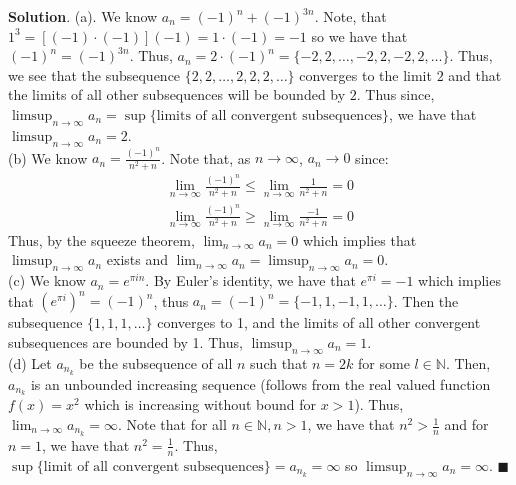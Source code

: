 \documentclass[12pt]{article}
\renewcommand{\=}[1]{\stackrel{#1}{=}} %
\providecommand{\NN}{\mathbb{N}}
\theoremstyle{definition}
\newenvironment{s}{%
        \begin{trivlist} \item \textbf{Solution}. }{%
            \hspace*{\fill} $\blacksquare$\end{trivlist}}%
\begin{document}
\begin{s}
    (a). We know $a_n = (-1)^n + (-1)^{3n}$. Note, that $1^3 = [(-1)\cdot(-1)](-1) = 1\cdot(-1) = -1$ so
    we have that $(-1)^n = (-1)^{3n}$. Thus, $a_n = 2\cdot(-1)^n = \{-2,2,\hdots,-2,2,-2,2,\hdots\}$. Thus, we see
    that the subsequence $\{2,2,\hdots,2,2,2,\hdots\}$ converges to the limit $2$ and that the limits of all other
    subsequences will be bounded by $2$. Thus since, $\limsup_{n\to\infty}a_n = \sup\{\text{limits of all convergent subsequences}\}$,
    we have that $\limsup_{n\to\infty}a_n = 2$.\\
    (b) We know $a_n = \frac{(-1)^n}{n^2+n}$. Note that, as $n\to\infty$, $a_n\to0$ since:
    \begin{align*}
        \lim_{n\to\infty} \frac{(-1)^n}{n^2+n} \leq \lim_{n\to\infty} \frac{1}{n^2+n} = 0 \\
        \lim_{n\to\infty} \frac{(-1)^n}{n^2+n} \geq \lim_{n\to\infty} \frac{-1}{n^2+n} = 0
    \end{align*}
    Thus, by the squeeze theorem, $\lim_{n\to\infty} a_n = 0$ which implies that $\limsup_{n\to\infty}a_n$ exists
    and $\lim_{n\to\infty} a_n = \limsup_{n\to\infty}a_n = 0$.\\
    (c) We know $a_n = e^{\pi in}$. By Euler's identity, we have that $e^{\pi i} = -1$ which implies that
    $(e^{\pi i})^n = (-1)^n$, thus $a_n = (-1)^n = \{-1, 1, -1, 1, \hdots\}$. Then the subsequence $\{1, 1, 1, \hdots\}$ 
    converges to 1, and the limits of all other convergent subsequences are bounded by 1. Thus,
    $\limsup_{n\to\infty} a_n = 1$.\\
    (d) Let $a_{n_k}$ be the subsequence of all $n$ such that $n = 2k$ for some $l\in\NN$. Then, $a_{n_k}$ is an
    unbounded increasing sequence (follows from the real valued function $f(x) = x^2$ which is increasing without bound
    for $x>1$). Thus, $\lim_{n\to\infty} a_{n_k} = \infty$. Note that for all $n\in\NN, n > 1$, we have that $n^2 > \frac{1}{n}$
    and for $n=1$, we have that $n^2 = \frac{1}{n}$. Thus, $\sup\{\text{limit of all convergent subsequences}\} = a_{n_k} = 
    \infty$ so $\limsup_{n\to\infty} a_n = \infty$.
\end{s}
\end{document}
